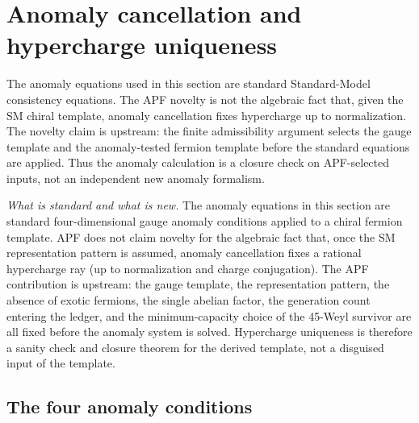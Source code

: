 \documentclass[11pt]{article}
\theoremstyle{definition}
\begin{document}
\newpage


\section{Anomaly cancellation and hypercharge uniqueness}
\label{sec:hypercharge}


\begin{tcolorbox}[apfbox, title={Novelty boundary: standard anomaly algebra versus APF input selection}]
\footnotesize
The anomaly equations used in this section are standard Standard-Model
consistency equations.  The APF novelty is not the algebraic fact that,
given the SM chiral template, anomaly cancellation fixes hypercharge up to
normalization.  The novelty claim is upstream: the finite admissibility
argument selects the gauge template and the anomaly-tested fermion template
before the standard equations are applied.  Thus the anomaly calculation is
a closure check on APF-selected inputs, not an independent new anomaly
formalism.
\end{tcolorbox}

\noindent\textit{What is standard and what is new.}\quad
The anomaly equations in this section are standard four-dimensional gauge
anomaly conditions applied to a chiral fermion template.  APF does not
claim novelty for the algebraic fact that, once the SM representation
pattern is assumed, anomaly cancellation fixes a rational hypercharge ray
(up to normalization and charge conjugation).  The APF contribution is
upstream: the gauge template, the representation pattern, the absence of
exotic fermions, the single abelian factor, the generation count entering
the ledger, and the minimum-capacity choice of the 45-Weyl survivor are
all fixed before the anomaly system is solved.  Hypercharge uniqueness is
therefore a sanity check and closure theorem for the derived template, not
a disguised input of the template.


\subsection{The four anomaly conditions}
\label{sec:anomaly_conditions}
\end{document}
